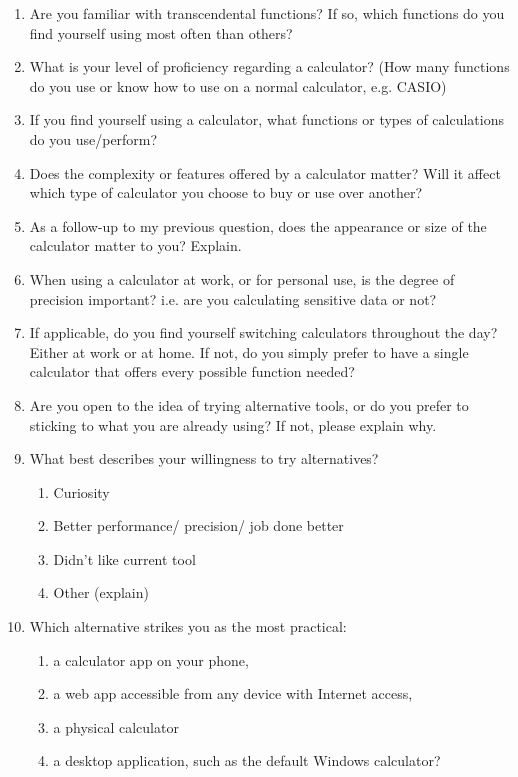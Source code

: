 \documentclass[11pt,onside]{report}
\begin{document}
\begin{enumerate}
    \item Are you familiar with transcendental functions? If so, which functions do you find yourself using most often than others?
    \item What is your level of proficiency regarding a calculator? (How many functions do you use or know how to use on a normal calculator, e.g. CASIO)
    \item If you find yourself using a calculator, what functions or types of calculations do you use/perform?
    \item Does the complexity or features offered by a calculator matter? Will it affect which type of calculator you choose to buy or use over another?
    \item As a follow-up to my previous question, does the appearance or size of the calculator matter to you? Explain.
    \item When using a calculator at work, or for personal use, is the degree of precision important? i.e. are you calculating sensitive data or not?
    \item If applicable, do you find yourself switching calculators throughout the day? Either at work or at home. If not, do you simply prefer to have a single calculator that offers every possible function needed?
    \item Are you open to the idea of trying alternative tools, or do you prefer to sticking to what you are already using? If not, please explain why.
    \item What best describes your willingness to try alternatives?
    \begin{enumerate}
        \item Curiosity
        \item Better performance/ precision/ job done better
        \item Didn’t like current tool
        \item Other (explain)
    \end{enumerate}
    \item Which alternative strikes you as the most practical:
    \begin{enumerate}
        \item a calculator app on your phone,
        \item a web app accessible from any device with Internet access,
        \item a physical calculator
        \item a desktop application, such as the default Windows calculator?

\end{enumerate}
\end{enumerate}
\end{document}
